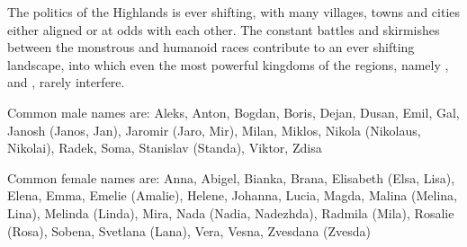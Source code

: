 
The politics of the Highlands is ever shifting, with many villages, towns
and cities either aligned or at odds with each other. The constant battles
and skirmishes between the monstrous and humanoid races contribute to an
ever shifting landscape, into which even the most powerful kingdoms of the
regions, namely ,  and
, rarely interfere.

Common male names are: Aleks, Anton, Bogdan, Boris, Dejan, Dusan, Emil,
Gal, Janosh (Janos, Jan), Jaromir (Jaro, Mir), Milan, Miklos, Nikola
(Nikolaus, Nikolai), Radek, Soma, Stanislav (Standa), Viktor, Zdisa

Common female names are: Anna, Abigel, Bianka, Brana, Elisabeth (Elsa, Lisa),
Elena, Emma, Emelie (Amalie), Helene, Johanna, Lucia, Magda, Malina (Melina,
Lina), Melinda (Linda), Mira, Nada (Nadia, Nadezhda), Radmila (Mila), Rosalie
(Rosa), Sobena, Svetlana (Lana), Vera, Vesna, Zvesdana (Zvesda)
